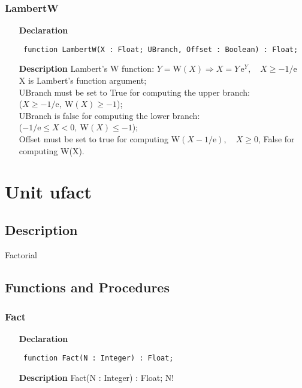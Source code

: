 \documentclass[12pt,a4paper,oneside]{report}
\newcommand{\euler}{\mathrm{e}}
\newcommand{\declarationitem}[1]{\textbf{#1}}
\newcommand{\descriptiontitle}[1]{\textbf{#1}}
\newcommand{\code}[1]{\texttt{#1}}
\begin{document}
\subsubsection{LambertW}
\label{ulambert-LambertW}
\begin{itemize}\item[\declarationitem{Declaration}\hfill]
	\begin{flushleft}
		\code{
			function LambertW(X : Float; UBranch, Offset : Boolean) : Float;}
		
	\end{flushleft}
	
	\par
	\item[\descriptiontitle{Description}]
	Lambert's W function: $Y=\textrm{W}(X) \Longrightarrow X=Y\,\euler^Y,\quad X\ge -1/\euler$ \\
	X is Lambert's function argument; \\
	UBranch must be set to True for computing the upper branch:\\
	 ($X\ge-1/\euler,\ \textrm{W}(X) \ge -1$);\\
	UBranch is false for computing the lower branch:\\
	  ($-1/\euler \le X < 0,\ \textrm{W}(X) \le -1$);\\
	Offset must be set to true for computing $\textrm{W}(X - 1/\euler),\quad X\ge 0$,
	False for computing \textrm{W}(X).   
	
\end{itemize}

\section{Unit ufact}
\label{ufact}
\subsection{Description}
Factorial 
\subsection{Functions and Procedures}
\subsubsection{Fact}
\label{ufact-Fact}
\begin{itemize}\item[\declarationitem{Declaration}\hfill]
	\begin{flushleft}
		\code{
			function Fact(N : Integer) : Float;}
		
	\end{flushleft}
	
	\par
	\item[\descriptiontitle{Description}]
	Fact(N : Integer) : Float; N!
	
\end{itemize}
\end{document}
